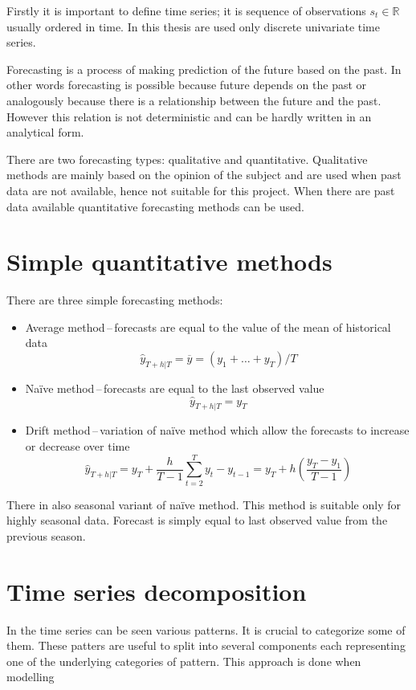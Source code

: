 Firstly it is important to define time series; it is sequence of observations
$ s_t \in \mathbb{R} $ usually ordered in time. In this thesis are used only
discrete univariate time series. 

Forecasting is a process of making prediction of the future based 
on the past. In other words forecasting is possible because  
future depends on the past or analogously because there is a relationship
between the future and the past. However this relation is not deterministic and 
can be hardly written in an analytical form.


There are two forecasting types: qualitative and quantitative.
Qualitative methods are mainly based on the opinion of the subject and are used 
when past data are not available, hence not suitable for this project. 
When there are past data available quantitative forecasting methods can be used. 

\section{Simple quantitative methods}

There are three simple forecasting methods:
\begin{itemize}
    \item Average method\,--\,forecasts are equal to the value of the mean of
        historical data 
        $$ \hat{y}_{T+h|T} = \overline{y} = (y_{1}+ \dots + y_{T}) / T $$
    \item Na\"{i}ve method\,--\,forecasts are equal to the last observed value
        $$ \hat{y}_{T+h|T} = y_{T} $$ 
    \item Drift method\,--\,variation of na\"{i}ve method which allow the
        forecasts to increase or decrease over time
        $$ \hat{y}_{T+h|T} = y_{T} + \frac{h}{T-1} \sum_{t=2}^T{y_{t} - y_{t-1}} = 
        y_{T} + h(\frac{y_{T}-y_{1}}{T-1}) $$
\end{itemize}
There in also seasonal variant of na\"{i}ve method. This method is suitable only
for highly seasonal data. Forecast is simply equal to last observed value from
the previous season.

\section{Time series decomposition}
In the time series can be seen various patterns. It is crucial to categorize
some of them. These patters are useful to split into several components 
each representing one of the underlying categories of pattern. This approach is
done when modelling 

